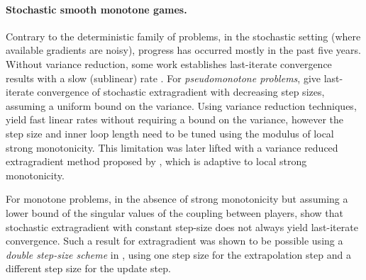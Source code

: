 \documentclass{article}
\begin{document}
\paragraph{Stochastic smooth monotone games.} 
Contrary to the deterministic family of problems, in the stochastic setting (where available gradients are noisy), progress has occurred mostly in the past five years. 
Without variance reduction, some work establishes last-iterate convergence results with a slow (sublinear) rate \citep{rosasco2014stochastic, mishchenko2020revisiting}.
For {\em pseudomonotone problems}, \citet{kannan2019optimal} give last-iterate convergence of stochastic extragradient with decreasing step sizes, assuming a uniform bound on the variance.
Using variance reduction techniques, \citet{palaniappan2016stochastic} yield fast linear rates without requiring a bound on the variance, however the step size and inner loop length need to be tuned using the modulus of local strong monotonicity. This limitation was later lifted with a variance reduced extragradient method proposed by  \citet{chavdarova2019reducing}, which is adaptive to local strong monotonicity.

For monotone problems, in the absence of strong monotonicity but assuming a lower bound of the singular values of the coupling between players, \citet{chavdarova2019reducing} show that stochastic extragradient with constant step-size does not always yield last-iterate convergence.
Such a result for extragradient was shown to be possible using a {\em double step-size scheme} in \citet{hsieh2020explore}, using one step size for the extrapolation step and a different step size for the update step. 
\end{document}

